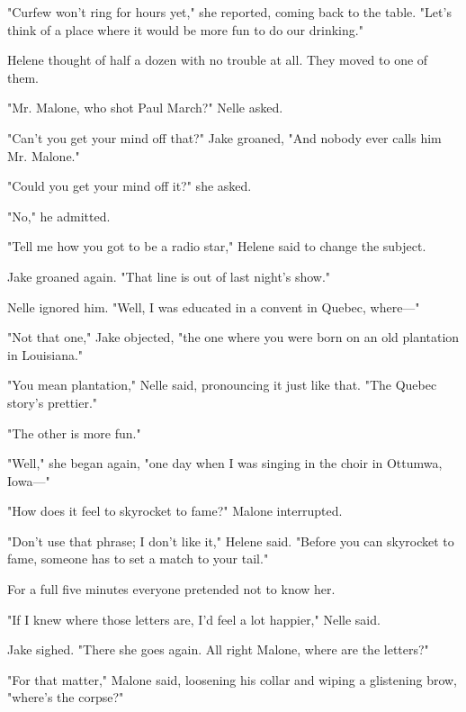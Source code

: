 \documentclass{novel}
\begin{document}
\begin{ChapterStart}
\vspace{3\nbs}
\end{ChapterStart}

"Curfew won’t ring for hours yet," she reported, coming back to the table. "Let’s think of a place where it would be more fun to do our drinking."

Helene thought of half a dozen with no trouble at all. They moved to one of them.

"Mr. Malone, who shot Paul March?" Nelle asked.

"Can’t you get your mind off that?" Jake groaned, "And nobody ever calls him Mr. Malone."

"Could you get your mind off it?" she asked.

"No," he admitted.

"Tell me how you got to be a radio star," Helene said to change the subject.

Jake groaned again. "That line is out of last night’s show."

Nelle ignored him. "Well, I was educated in a convent in Quebec, where—"

"Not that one," Jake objected, "the one where you were born on an old plantation in Louisiana."

"You mean plantation," Nelle said, pronouncing it just like that. "The Quebec story’s prettier."

"The other is more fun."

"Well," she began again, "one day when I was singing in the choir in Ottumwa, Iowa—"

"How does it feel to skyrocket to fame?" Malone interrupted.

"Don’t use that phrase; I don’t like it," Helene said. "Before you can skyrocket to fame, someone has to set a match to your tail."

For a full five minutes everyone pretended not to know her.

"If I knew where those letters are, I’d feel a lot happier," Nelle said.

Jake sighed. "There she goes again. All right Malone, where are the letters?"

"For that matter," Malone said, loosening his collar and wiping a glistening brow, "where’s the corpse?"
\end{document}
